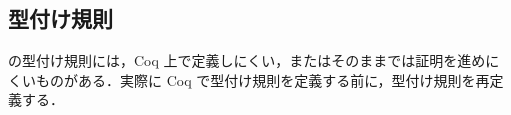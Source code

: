 











\subsection{型付け規則}


\api の型付け規則には，Coq 上で定義しにくい，またはそのままでは証明を進めにくいものがある．実際に Coq で型付け規則を定義する前に，型付け規則を再定義する．

